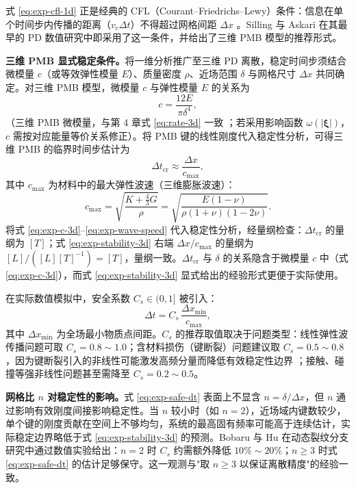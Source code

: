 式 \eqref{eq:exp-cfl-1d} 正是经典的 CFL（Courant--Friedrichs--Lewy）条件：信息在单个时间步内传播的距离（$v_c\Delta t$）不得超过网格间距 $\Delta x$ \cite{BelytschkoLiuMoran2000}。Silling 与 Askari \cite{SillingAskari2005} 在其最早的 PD 数值研究中即采用了这一条件，并给出了三维 PMB 模型的推荐形式。

\textbf{三维 PMB 显式稳定条件。}将一维分析推广至三维 PD 离散，稳定时间步须结合微模量 $c$（或等效弹性模量 $E$）、质量密度 $\rho$、近场范围 $\delta$ 与网格尺寸 $\Delta x$ 共同确定。对三维 PMB 模型，微模量 $c$ 与弹性模量 $E$ 的关系为 \cite{SillingAskari2005}
\begin{equation}
  c = \frac{12E}{\pi\delta^{4}},
  \label{eq:exp-c-3d}
\end{equation}
（三维 PMB 微模量，与第 4 章式 \eqref{eq:rate-3d} 一致 \cite{SillingAskari2005}；若采用影响函数 $\omega(|\boldsymbol{\xi}|)$，$c$ 需按对应能量等价关系修正）。将 PMB 键的线性刚度代入稳定性分析，可得三维 PMB 的临界时间步估计为
\begin{equation}
  \Delta t_{\text{cr}}
  \approx \frac{\Delta x}{c_{\max}},
  \label{eq:exp-stability-3d}
\end{equation}
其中 $c_{\max}$ 为材料中的最大弹性波速（三维膨胀波速）：
\begin{equation}
  c_{\max}
  =\sqrt{\frac{K+\frac{4}{3}G}{\rho}}
  =\sqrt{\frac{E(1-\nu)}{\rho(1+\nu)(1-2\nu)}}.
  \label{eq:exp-wave-speed}
\end{equation}
将式 \eqref{eq:exp-c-3d}--\eqref{eq:exp-wave-speed} 代入稳定性分析，经量纲检查：$\Delta t_{\text{cr}}$ 的量纲为 $[T]$；式 \eqref{eq:exp-stability-3d} 右端 $\Delta x/c_{\max}$ 的量纲为 $[L]/([L][T]^{-1})=[T]$，量纲一致。$\Delta t_{\text{cr}}$ 与 $\delta$ 的关系隐含于微模量 $c$ 中（式 \eqref{eq:exp-c-3d}），而式 \eqref{eq:exp-stability-3d} 显式给出的经验形式更便于实际使用。

在实际数值模拟中，安全系数 $C_s\in(0,1]$ 被引入：
\begin{equation}
  \Delta t
  = C_s\,\frac{\Delta x_{\min}}{c_{\max}},
  \label{eq:exp-safe-dt}
\end{equation}
其中 $\Delta x_{\min}$ 为全场最小物质点间距。$C_s$ 的推荐取值取决于问题类型：线性弹性波传播问题可取 $C_s=0.8\sim1.0$；含材料损伤（键断裂）问题建议取 $C_s=0.5\sim0.8$，因为键断裂引入的非线性可能激发高频分量而降低有效稳定性边界 \cite{HaBobaru2010,BobaruHu2012}；接触、碰撞等强非线性问题甚至需降至 $C_s=0.2\sim0.5$。

\textbf{网格比 $n$ 对稳定性的影响。}式 \eqref{eq:exp-safe-dt} 表面上不显含 $n=\delta/\Delta x$，但 $n$ 通过影响有效刚度间接影响稳定性。当 $n$ 较小时（如 $n=2$），近场域内键数较少，单个键的刚度贡献在空间上不够均匀，系统的最高固有频率可能高于连续估计，实际稳定边界略低于式 \eqref{eq:exp-stability-3d} 的预测。Bobaru 与 Hu \cite{BobaruHu2012} 在动态裂纹分支研究中通过数值实验给出：$n=2$ 时 $C_s$ 约需额外降低 $10\%\sim20\%$；$n\ge3$ 时式 \eqref{eq:exp-safe-dt} 的估计足够保守。这一观测与"取 $n\ge3$ 以保证离散精度"的经验一致。


